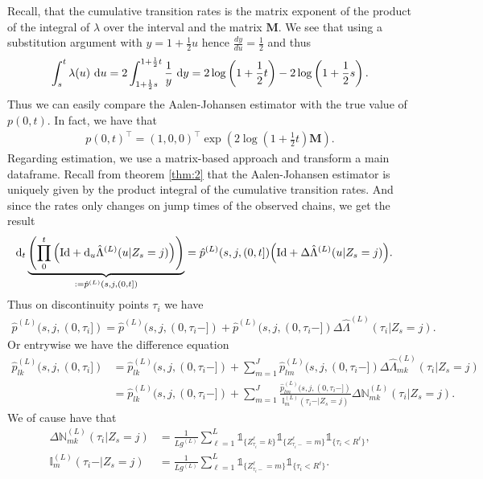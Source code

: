\documentclass[12pt,letter,twoside]{article}
\theoremstyle{plain}
\theoremstyle{definition}
\theoremstyle{remark}
\begin{document}
Recall, that the cumulative transition rates is the matrix exponent of the product of the integral of $\lambda$ over the interval and the matrix $\mathbf M$. We see that using a substitution argument with $y=1+\frac{1}{2}u$ hence $\frac{dy}{du}=\frac{1}{2}$ and thus
\begin{align}
\int_s^t\lambda(u)\ \text du=2\int_{1+\frac{1}{2}s}^{1+\frac{1}{2}t}\frac{1}{y}\ \text dy=2\log\left(1+\frac{1}{2}t\right)-2\log\left(1+\frac{1}{2}s\right).
\end{align}
Thus we can easily compare the Aalen-Johansen estimator with the true value of $p(0,t)$. In fact, we have that
\begin{align}
    p(0,t)^\top=(1,0,0)^\top \exp\left(2\log\left(1+\frac{1}{2}t\right)\mathbf M\right ).
\end{align}
Regarding estimation, we use a matrix-based approach and transform a main dataframe. Recall from theorem \ref{thm:2} that the Aalen-Johansen estimator is uniquely given by the product integral of the cumulative transition rates. And since the rates only changes on jump times of the observed chains, we get the result
\begin{align}
\text d_t\underbrace{\left( \prod_0^t\Big(\text{Id} +\text d_u \hat \Lambda^{(L)}(u\vert Z_s=j)\Big)\right)}_{:=\hat p^{(L)}(s,j,(0,t])}&=\hat p^{(L)}(s,j,(0,t])\Big(\text{Id} + \Delta\hat \Lambda^{(L)}(u\vert Z_s=j)\Big).
\end{align}
Thus on discontinuity points $\tau_i$ we have
\begin{align}
\hat p^{(L)}(s,j,(0,\tau_i])=\hat p^{(L)}(s,j,(0,\tau_i-])+\hat p^{(L)}(s,j,(0,\tau_i-])\Delta\hat \Lambda^{(L)}(\tau_i\vert Z_s=j).
\end{align}
Or entrywise we have the difference equation
\begin{align}
\hat p^{(L)}_{lk}(s,j,(0,\tau_i])&=\hat p^{(L)}_{lk}(s,j,(0,\tau_i-])+\sum_{m=1}^J \hat p^{(L)}_{lm}(s,j,(0,\tau_i-])\Delta \hat \Lambda^{(L)}_{mk}(\tau_i\vert Z_s=j)\\
&=\hat p^{(L)}_{lk}(s,j,(0,\tau_i-])+\sum_{m=1}^J \frac{\hat p^{(L)}_{lm}(s,j,(0,\tau_i-])}{\mathbb I_m^{(L)}(\tau_i-\vert Z_s=j)}\Delta\mathbb N^{(L)}_{mk}(\tau_i\vert Z_s=j).
\end{align}
We of cause have that
\begin{align}
\Delta\mathbb N^{(L)}_{mk}(\tau_i\vert Z_s=j)&=\frac{1}{Lg^{(L)}}\sum_{\ell = 1}^L\mathds 1_{\{Z_{\tau_i}^\ell = k\}}\mathds 1_{\{Z_{\tau_i-}^\ell = m\}}\mathds 1_{\{\tau_i<R^\ell \}},\\
\mathbb I_m^{(L)}(\tau_i-\vert Z_s=j)&=\frac{1}{Lg^{(L)}}\sum_{\ell = 1}^L\mathds 1_{\{Z_{\tau_i-}^\ell = m\}}\mathds 1_{\{\tau_i<R^\ell \}}.
\end{align}
\end{document}
